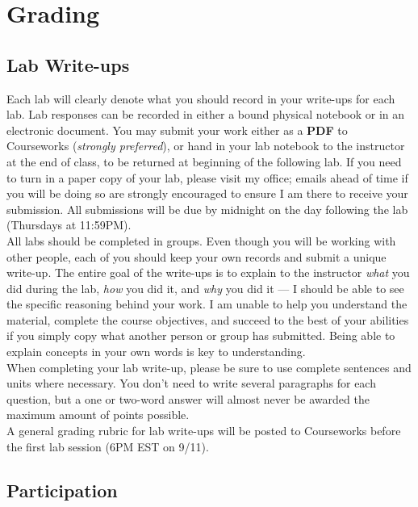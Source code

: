 \documentclass[11pt]{article}
\begin{document}
\section*{Grading}

\subsection*{Lab Write-ups}

Each lab will clearly denote what you should record in your write-ups for each lab. Lab responses can be recorded in either a bound physical notebook or in an electronic document. You may submit your work either as a \textbf{PDF} to Courseworks (\textit{strongly preferred}), or hand in your lab notebook to the instructor at the end of class, to be returned at beginning of the following lab. If you need to turn in a paper copy of your lab, please visit my office; emails ahead of time if you will be doing so are strongly encouraged to ensure I am there to receive your submission. All submissions will be due by midnight on the day following the lab (Thursdays at 11:59PM). \\

All labs should be completed in groups. Even though you will be working with other people, each of you should keep your own records and submit a unique write-up. The entire goal of the write-ups is to explain to the instructor \textit{what} you did during the lab, \textit{how} you did it, and \textit{why} you did it --- I should be able to see the specific reasoning behind your work. I am unable to help you understand the material, complete the course objectives, and succeed to the best of your abilities if you simply copy what another person or group has submitted. Being able to explain concepts in your own words is key to understanding. \\

When completing your lab write-up, please be sure to use complete sentences and units where necessary. You don't need to write several paragraphs for each question, but a one or two-word answer will almost never be awarded the maximum amount of points possible. \\

A general grading rubric for lab write-ups will be posted to Courseworks before the first lab session (6PM EST on 9/11).


\subsection*{Participation}
\end{document}
